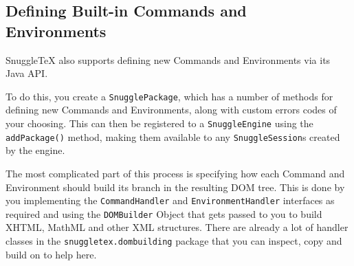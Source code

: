 \subsection*{Defining Built-in Commands and Environments}

SnuggleTeX also supports defining new Commands and Environments via its Java API.

To do this, you create a \verb|SnugglePackage|, which has a number of methods for
defining new Commands and Environments, along with custom errors codes of your choosing.
This can then be registered to a \verb|SnuggleEngine| using the
\verb|addPackage()| method, making them available to any \verb|SnuggleSession|s
created by the engine.

The most complicated part of this process is specifying how each Command and
Environment should build its branch in the resulting DOM tree. This is done
by you implementing the \verb|CommandHandler| and \verb|EnvironmentHandler| interfaces
as required and using the \verb|DOMBuilder| Object that gets passed
to you to build XHTML, MathML and other XML structures. There are already a lot
of handler classes in the \verb|snuggletex.dombuilding| package that you can
inspect, copy and build on to help here.
